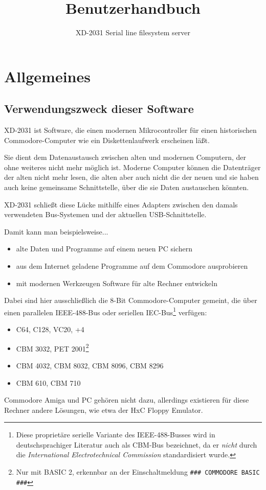 \documentclass[10pt,a4paper]{scrartcl}		%
\begin{document}
\title{Benutzerhandbuch}
\subtitle{XD-2031 Serial line filesystem server}
\author{}
\maketitle\thispagestyle{empty}

\clearpage

\tableofcontents
\clearpage

\section{Allgemeines}

\subsection{Verwendungszweck dieser Software}
XD-2031 ist Software, die einen modernen Mikrocontroller für einen
historischen Commodore-Computer wie ein Diskettenlaufwerk erscheinen läßt.

Sie dient dem Datenaustausch zwischen alten und modernen Computern, der
ohne weiteres nicht mehr möglich ist. 
Moderne Computer können die Datenträger der alten nicht mehr lesen,
die alten aber auch nicht die der neuen und sie haben auch keine gemeinsame 
Schnittstelle, über die sie Daten austauschen könnten.

XD-2031 schließt diese Lücke mithilfe eines Adapters zwischen den
damals verwendeten Bus-Systemen und der aktuellen USB-Schnittstelle.

Damit kann man beispielsweise...
\begin{itemize}
\item alte Daten und Programme auf einem neuen PC sichern
\item aus dem Internet geladene Programme auf dem Commodore ausprobieren
\item mit modernen Werkzeugen Software für alte Rechner entwickeln
\end{itemize}

Dabei sind hier ausschließlich die 8-Bit Commodore-Computer gemeint, die 
über einen parallelen IEEE-488-Bus  oder seriellen
	  IEC-Bus\footnote
	{Diese proprietäre serielle Variante des IEEE-488-Busses wird
	in deutschsprachiger Literatur auch als CBM-Bus bezeichnet,
	da er \textit{nicht} durch die
	\textit{International Electrotechnical Commission} standardisiert
	wurde.}
verfügen:
\begin{itemize}
\item C64, C128, VC20, +4
\item CBM 3032, 
PET 2001\footnote{
	Nur mit BASIC 2, erkennbar an der Einschaltmeldung 
	\texttt{\#\#\# COMMODORE BASIC \#\#\#}}
\item CBM 4032, CBM 8032, CBM 8096, CBM 8296 
\item CBM 610, CBM 710
\end{itemize}
Commodore Amiga und PC gehören nicht dazu, allerdings existieren 
für diese Rechner andere Lösungen, wie etwa der HxC Floppy Emulator.
\end{document}
